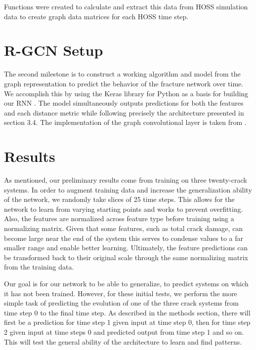 Functions were created to calculate and extract this data from HOSS simulation data to create graph data matrices for each HOSS time step.  

\section{R-GCN Setup}
The second milestone is to construct a working algorithm and model from the graph representation to predict the behavior of the fracture network over time. We accomplish this by using the Keras library for Python as a basis for building our RNN \cite{chollet2015keras}. The model simultaneously outputs predictions for both the features and each distance metric while following precisely the architecture presented in section 3.4. The implementation of the graph convolutional layer is taken from \cite{kipf2016semi}.

\section{Results}

As mentioned, our preliminary results come from training on three twenty-crack systems. In order to augment training data and increase the generalization ability of the network, we randomly take slices of 25 time steps. This allows for the network to learn from varying starting points and works to prevent overfitting. Also, the features are normalized across feature type before training using a normalizing matrix. Given that some features, such as total crack damage, can become large near the end of the system this serves to condense values to a far smaller range and enable better learning. Ultimately, the feature predictions can be transformed back to their original scale through the same normalizing matrix from the training data.

Our goal is for our network to be able to generalize, to predict systems on which it has not been trained. However, for these initial tests, we perform the more simple task of predicting the evolution of one of the three crack systems from time step 0 to the final time step. As described in the methods section, there will first be a prediction for time step 1 given input at time step 0, then for time step 2 given input at time steps 0 and predicted output from time step 1 and so on. This will test the general ability of the architecture to learn and find patterns.

